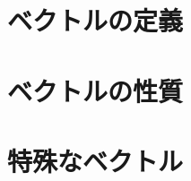 ﻿%
        \section{ベクトルの定義}
        

        \section{ベクトルの性質}
        

        

        \section{特殊なベクトル}
        